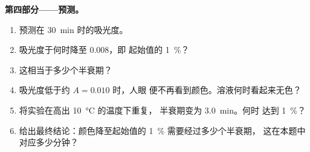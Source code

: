\begin{problem}
\medskip
\noindent\textbf{第四部分——预测。}
\begin{enumerate}[resume]
  \item 预测在 \qty{30}{min} 时的吸光度。
  \item 吸光度于何时降至 0.008，即
        起始值的 \qty{1}{\percent}？
  \item 这相当于多少个半衰期？
  \item 吸光度低于约 $A = 0.010$ 时，人眼
        便不再看到颜色。溶液何时看起来无色？
  \item 将实验在高出 \qty{10}{\celsius} 的温度下重复，
        半衰期变为 \qty{3.0}{min}。何时
        达到 \qty{1}{\percent}？
  \item 给出最终结论：颜色降至起始值的
        \qty{1}{\percent} 需要经过多少个半衰期，
        这在本题中对应多少分钟？
\end{enumerate}
\end{problem}

